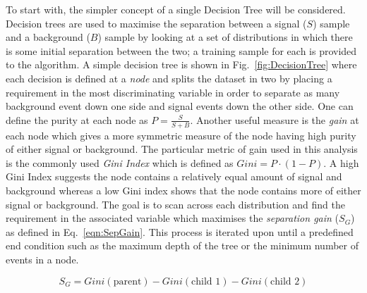 To start with, the simpler concept of a single Decision Tree will be considered. Decision trees are used to maximise the separation between a signal ($S$) sample and a background ($B$) sample by looking at a set of distributions in which there is some initial separation between the two; a training sample for each is provided to the algorithm. A simple decision tree is shown in Fig.~\ref{fig:DecisionTree} where each decision is defined at a \emph{node} and splits the dataset in two by placing a requirement in the most discriminating variable in order to separate as many background event down one side and signal events down the other side.
One can define the purity at each node as $P=\frac{S}{S+B}$. Another useful measure is the \emph{gain} at each node which gives a more symmetric measure of the node having high purity of either signal or background. The particular metric of gain used in this analysis is the commonly used \emph{Gini Index} which is defined as $Gini = P\cdot\left(1-P\right)$. A high Gini Index suggests the node contains a relatively equal amount of signal and background whereas a low Gini index shows that the node contains more of either signal or background. 
The goal is to scan across each distribution and find the requirement in the associated variable which maximises the \emph{separation gain} ($S_{G}$) as defined in Eq.~\ref{eqn:SepGain}. This process is iterated upon until a predefined end condition such as the maximum depth of the tree or the minimum number of events in a node.




\begin{equation}
S_{G} = Gini(\textrm{parent}) - Gini(\textrm{child 1}) - Gini(\textrm{child 2})
\label{eqn:SepGain}
\end{equation}

